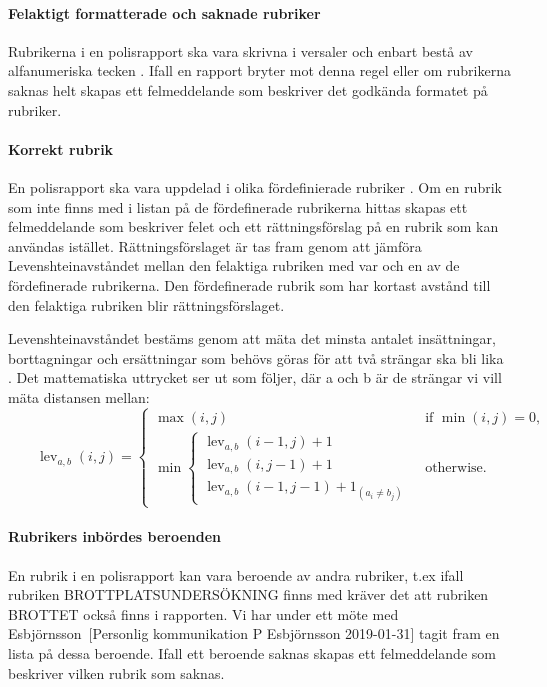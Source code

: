 \documentclass[swedish]{maucsthesis}
\begin{document}
\paragraph*{Felaktigt formatterade och saknade rubriker}

Rubrikerna i en polisrapport ska vara skrivna i versaler och enbart bestå av 
alfanumeriska tecken \cite{durtva:2017}. Ifall en rapport bryter mot denna regel 
eller om rubrikerna saknas helt skapas ett felmeddelande som beskriver det godkända
formatet på rubriker.

\paragraph*{Korrekt rubrik}

En polisrapport ska vara uppdelad i olika fördefinierade rubriker
\cite{durtva:2017}. Om en rubrik som inte finns med i listan på de
fördefinerade \cite{per:2018} rubrikerna hittas skapas ett felmeddelande som beskriver felet och
ett rättningsförslag på en rubrik som kan användas istället. Rättningsförslaget
är tas fram genom att jämföra Levenshteinavståndet mellan den felaktiga rubriken
med var och en av de fördefinerade rubrikerna. Den fördefinerade rubrik som har
kortast avstånd till den felaktiga rubriken blir rättningsförslaget.

Levenshteinavståndet bestäms genom att mäta det minsta antalet insättningar, borttagningar och ersättningar
som behövs göras för att två strängar ska bli lika \cite{navarro:2001}.
Det mattematiska uttrycket ser ut som följer, där a och b är de strängar vi vill mäta distansen mellan:
\[\qquad\operatorname{lev}_{a,b}(i,j) = \begin{cases}
  \max(i,j) & \text{ if } \min(i,j)=0, \\
  \min \begin{cases}
          \operatorname{lev}_{a,b}(i-1,j) + 1 \\
          \operatorname{lev}_{a,b}(i,j-1) + 1 \\
          \operatorname{lev}_{a,b}(i-1,j-1) + 1_{(a_i \neq b_j)}
       \end{cases} & \text{ otherwise.}
\end{cases}\]

\paragraph*{Rubrikers inbördes beroenden}

En rubrik i en polisrapport kan vara beroende av andra rubriker, t.ex ifall
rubriken BROTTPLATSUNDERSÖKNING finns med kräver det att rubriken BROTTET också
finns i rapporten. Vi har under ett möte med Esbjörnsson~[Personlig kommunikation P Esbjörnsson 2019-01-31]
tagit fram en lista på dessa beroende. Ifall ett beroende saknas skapas ett felmeddelande
som beskriver vilken rubrik som saknas.
\end{document}

